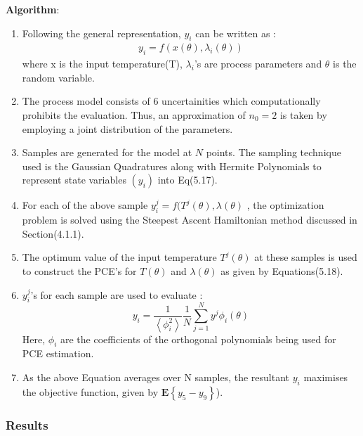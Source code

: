 \documentclass[3p,times,authoryear]{elsarticle}
\begin{document}
\textbf{Algorithm}:
\begin{enumerate}

\item Following the general representation, $y_{i}$ can be written as :
\begin{align*}
y_{i} = f(x(\theta),\lambda_{i}(\theta))
\end{align*}
where x is the input temperature(T), $\lambda_{i}$'s are process parameters and $\theta$ is the random variable.
\item The process model consists of 6 uncertainities which computationally prohibits the evaluation. Thus, an approximation of $n_{0} = 2$ is taken by employing a joint distribution of the parameters.
\item Samples are generated for the model at $N$ points. The sampling technique used is the Gaussian Quadratures along with Hermite Polynomials to represent state variables $(y_{i})$ into Eq(5.17).

\item For each of the above sample $y^{j}_{i} = f(T^{j}(\theta),\lambda(\theta) $ ,  the optimization problem is solved using the Steepest Ascent Hamiltonian method discussed in Section(4.1.1).

\item The optimum value of the input temperature $T^{j}(\theta)$ at these samples is used to construct the PCE's for $T(\theta)$ and $\lambda(\theta)$ as given by Equations(5.18).

\item $y^{j}_{i}$'s for each sample are used to evaluate :
\begin{equation}
y_{i} = \frac{1}{\left\langle \phi^{2}_{i}\right\rangle }\frac{1}{N} \sum_{j=1}^{N} y^{j}\phi_{i}(\theta)
\end{equation}
Here, $\phi_{i}$ are the coefficients of the orthogonal polynomials being used for PCE estimation.  

\item As the above Equation averages over N samples, the resultant $y_{i}$ maximises the objective function, given by $ \mathbf{E} \left\lbrace  y_{5}-y_{9} \right\rbrace $). 

\end{enumerate} 

\subsubsection{Results}
\end{document}
